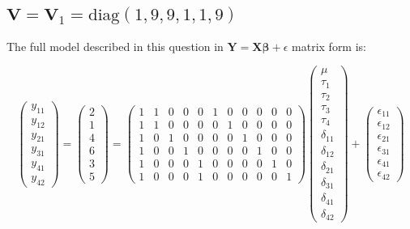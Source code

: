\documentclass[11pt]{article}
\begin{document}
\subsection{$\mathbf{V} = \mathbf{V}_1 = \mathrm{diag}(1,9,9,1,1,9)$}
\label{sec-2-1}



The full model described in this question in 
$\mathbf{Y}=\mathbf{X\beta}+\epsilon$ matrix form is:

\[
\begin{pmatrix}
y_{11} \\ y_{12}\\ y_{21}\\ y_{31}\\ y_{41}\\ y_{42}
\end{pmatrix} = 
\begin{pmatrix} 
2\\ 1\\ 4\\ 6\\ 3\\ 5
\end{pmatrix} = 
\begin{pmatrix}
1 & 1 & 0 & 0 & 0 & 1 & 0 & 0 & 0 & 0 & 0 \\
1 & 1 & 0 & 0 & 0 & 0 & 1 & 0 & 0 & 0 & 0 \\
1 & 0 & 1 & 0 & 0 & 0 & 0 & 1 & 0 & 0 & 0 \\
1 & 0 & 0 & 1 & 0 & 0 & 0 & 0 & 1 & 0 & 0 \\
1 & 0 & 0 & 0 & 1 & 0 & 0 & 0 & 0 & 1 & 0 \\
1 & 0 & 0 & 0 & 1 & 0 & 0 & 0 & 0 & 0 & 1 
\end{pmatrix}  
\begin{pmatrix}
\mu \\ \tau_1 \\ \tau_2 \\ \tau_3 \\ \tau_4 \\ \delta_{11}
\\ \delta_{12} \\ \delta_{21} \\ \delta_{31} \\ \delta_{41} \\ \delta_{42}
\end{pmatrix} + 
\begin{pmatrix}
\epsilon_{11} \\ \epsilon_{12}\\ \epsilon_{21}\\ \epsilon_{31}\\ \epsilon_{41}\\ \epsilon_{42}
\end{pmatrix}
\]
\end{document}

